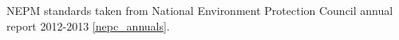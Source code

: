 NEPM standards taken from National Environment Protection Council annual report 2012-2013 \ref{nepc_annuals}.